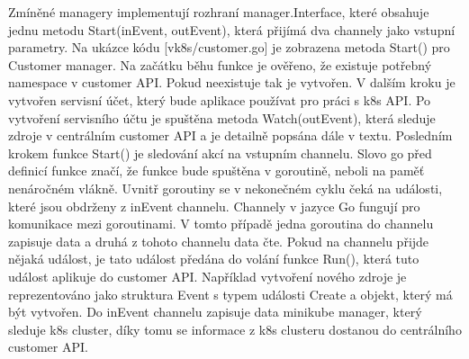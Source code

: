 											    Zmíněné managery implementují rozhraní manager.Interface, které obsahuje jednu metodu Start(inEvent, outEvent), která přijímá dva channely jako vstupní parametry. Na ukázce kódu [vk8s/customer.go] je zobrazena metoda Start() pro Customer manager. Na začátku běhu funkce je ověřeno, že existuje potřebný namespace v customer API. Pokud neexistuje tak je vytvořen. V dalším kroku je vytvořen servisní účet, který bude aplikace používat pro práci s k8s API. Po vytvoření servisního účtu je spuštěna metoda Watch(outEvent), která sleduje zdroje v centrálním customer API a je detailně popsána dále v textu. Posledním krokem funkce Start() je sledování akcí na vstupním channelu. Slovo go před definicí funkce značí, že funkce bude spuštěna v goroutině, neboli na paměť nenáročném vlákně. Uvnitř goroutiny se v nekonečném cyklu čeká na události, které jsou obdrženy z inEvent channelu. Channely v jazyce Go fungují pro komunikace mezi goroutinami. V tomto případě jedna goroutina do channelu zapisuje data a druhá z tohoto channelu data čte. Pokud na channelu přijde nějaká událost, je tato událost předána do volání funkce Run(), která tuto událost aplikuje do customer API. Například vytvoření nového zdroje je reprezentováno jako struktura Event s typem události Create a objekt, který má být vytvořen. Do inEvent channelu zapisuje data minikube manager, který sleduje k8s cluster, díky tomu se informace z k8s clusteru dostanou do centrálního customer API.

